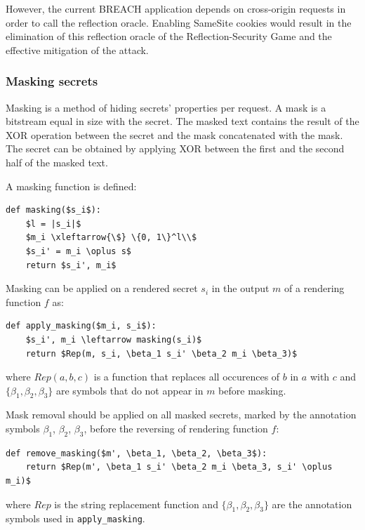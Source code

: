\documentclass[conference, letterpaper, 10pt]{IEEEtran}
\begin{document}
However, the current BREACH application depends on cross-origin requests in
order to call the reflection oracle.
Enabling SameSite cookies would result in the elimination of this reflection
oracle of the Reflection-Security Game and the effective mitigation of the
attack.

\subsubsection{Masking secrets}\label{subsec:masking}
Masking is a method of hiding secrets' properties per request. A mask is a
bitstream equal in size with the secret. The masked text contains the result of
the XOR operation between the secret and the mask concatenated with the mask.
The secret can be obtained by applying XOR between the first and the second
half of the masked text.

A masking function is defined:

\begin{lstlisting}[texcl,mathescape,basicstyle=\small]
def masking($s_i$):
    $l = |s_i|$
    $m_i \xleftarrow{\$} \{0, 1\}^l\\$
    $s_i' = m_i \oplus s$
    return $s_i', m_i$
\end{lstlisting}

Masking can be applied on a rendered secret $s_i$ in the output $m$ of a
rendering function $f$ as:

\begin{lstlisting}[texcl,mathescape,basicstyle=\small]
def apply_masking($m_i, s_i$):
    $s_i', m_i \leftarrow masking(s_i)$
    return $Rep(m, s_i, \beta_1 s_i' \beta_2 m_i \beta_3)$
\end{lstlisting}

where $Rep(a, b, c)$ is a function that replaces all occurences of $b$ in
$a$ with $c$ and $\{\beta_1, \beta_2, \beta_3\}$ are symbols that do not
appear in $m$ before masking.

Mask removal should be applied on all masked secrets, marked by the annotation
symbols $\beta_1$, $\beta_2$, $\beta_3$, before the reversing of rendering function $f$:

\begin{lstlisting}[texcl,mathescape,basicstyle=\small]
def remove_masking($m', \beta_1, \beta_2, \beta_3$):
    return $Rep(m', \beta_1 s_i' \beta_2 m_i \beta_3, s_i' \oplus m_i)$
\end{lstlisting}

where $Rep$ is the string replacement function and $\{\beta_1, \beta_2,
\beta_3\}$ are the annotation symbols used in \texttt{apply\_masking}.
\end{document}
